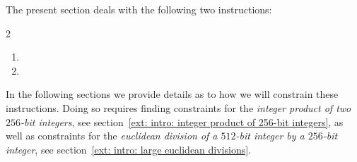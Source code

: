 The present section deals with the following two instructions:
\begin{multicols}{2}
	\begin{enumerate}
		\item {}
		\item {}
	\end{enumerate}
\end{multicols}
\noindent In the following sections we provide details as to how we will constrain these instructions. Doing so requires finding 
constraints for the \emph{integer product of two $256$-bit integers},
see section~\ref{ext: intro: integer product of 256-bit integers},
as well as 
constraints for the \emph{euclidean division of a $512$-bit integer by a $256$-bit integer},
see section~\ref{ext: intro: large euclidean divisions}.
